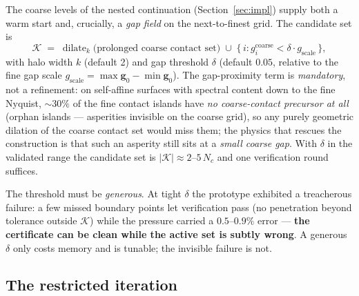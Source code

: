 \documentclass[11pt,a4paper]{article}
\newcommand{\bg}{\mathbf{g}}
\begin{document}
The coarse levels of the nested continuation (Section~\ref{sec:impl}) supply
both a warm start and, crucially, a \emph{gap field} on the next-to-finest
grid.  The candidate set is
\begin{equation}
  \mathcal{K} \;=\; \operatorname{dilate}_{k}\bigl(\text{prolonged coarse
  contact set}\bigr) \;\cup\; \{\,i : g^{\mathrm{coarse}}_i < \delta \cdot
  g_{\mathrm{scale}}\,\},
  \label{eq:candidate}
\end{equation}
with halo width $k$ (default 2) and gap threshold $\delta$ (default $0.05$,
relative to the fine gap scale $g_{\mathrm{scale}} = \max\bg_0 - \min\bg_0$).
The gap-proximity term is \emph{mandatory}, not a refinement: on self-affine
surfaces with spectral content down to the fine Nyquist, $\sim\!30\%$ of the
fine contact islands have \emph{no coarse-contact precursor at all} (orphan
islands --- asperities invisible on the coarse grid), so any purely geometric
dilation of the coarse contact set would miss them; the physics that rescues
the construction is that such an asperity still sits at a \emph{small coarse
gap}.  With $\delta$ in the validated range the candidate set is
$|\mathcal{K}| \approx 2$--$5\,N_c$ and one verification round suffices.

The threshold must be \emph{generous}.  At tight $\delta$ the prototype
exhibited a treacherous failure: a few missed boundary points let
verification pass (no penetration beyond tolerance outside $\mathcal{K}$)
while the pressure carried a $0.5$--$0.9\%$ error --- \textbf{the
certificate can be clean while the active set is subtly wrong}.  A generous
$\delta$ only costs memory and is tunable; the invisible failure is not.

\subsection{The restricted iteration}
\label{sec:active-restricted}
\end{document}
